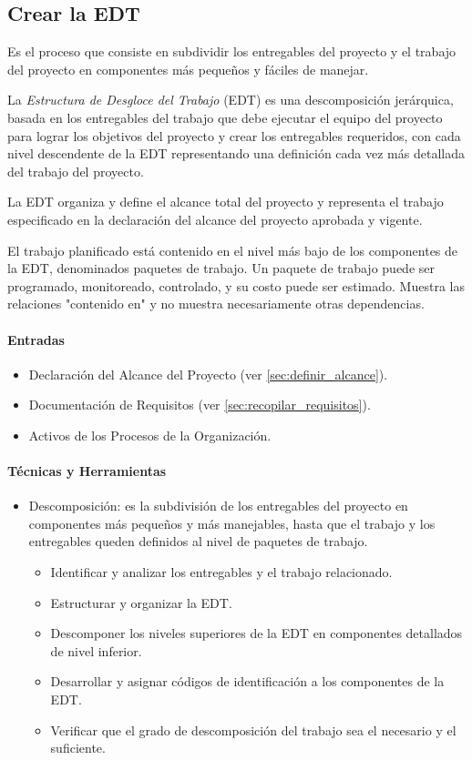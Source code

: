 \documentclass[a4paper,twosides]{article}
\newlength{\wideitemsep}
\let\olditem\item
\renewcommand{\item}{\setlength{\itemsep}{\wideitemsep}\olditem}
\begin{document}
\subsection{Crear la EDT} \label{sec:crear_edt}
\par Es el proceso que consiste en subdividir los entregables del proyecto y el trabajo del proyecto en componentes más pequeños y fáciles de manejar.
\par La \emph{Estructura de Desgloce del Trabajo} (EDT) es una descomposición jerárquica, basada en los entregables del trabajo que debe ejecutar el equipo del proyecto para lograr los objetivos del proyecto y crear los entregables requeridos, con cada nivel descendente de la EDT representando una definición cada vez más detallada del trabajo del proyecto.
\par La EDT organiza y define el alcance total del proyecto y representa el trabajo especificado en la declaración del alcance del proyecto aprobada y vigente.
\par El trabajo planificado está contenido en el nivel más bajo de los componentes de la EDT, denominados paquetes de trabajo. Un paquete de trabajo puede ser programado, monitoreado, controlado, y su costo puede ser estimado. Muestra las relaciones "contenido en" y no muestra necesariamente otras dependencias.
\paragraph{Entradas}
\begin{itemize}
\item Declaración del Alcance del Proyecto (ver \ref{sec:definir_alcance}).
\item Documentación de Requisitos (ver \ref{sec:recopilar_requisitos}).
\item Activos de los Procesos de la Organización.
\end{itemize}
\paragraph{Técnicas y Herramientas}
\begin{itemize}
\item Descomposición: es la subdivisión de los entregables del proyecto en componentes más pequeños y más manejables, hasta que el trabajo y los entregables queden definidos al nivel de paquetes de trabajo.
\begin{itemize}
\item Identificar y analizar los entregables y el trabajo relacionado.
\item Estructurar y organizar la EDT.
\item Descomponer los niveles superiores de la EDT en componentes detallados de nivel inferior.
\item Desarrollar y asignar códigos de identificación a los componentes de la EDT.
\item Verificar que el grado de descomposición del trabajo sea el necesario y el suficiente.
\end{itemize}
\end{itemize}
\end{document}
